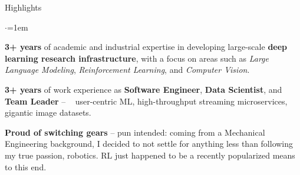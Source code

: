 \begin{xSection}{Highlights}
    \vspace{2mm}

    \small

    \begin{list}{$\cdot$}{\leftmargin=1em} %


    \item \textbf{3+ years} of academic and industrial expertise in developing large-scale \textbf{deep learning research infrastructure}, with a focus on areas such as \textit{Large Language Modeling}, \textit{Reinforcement Learning}, and \textit{Computer Vision}.

    \item \textbf{3+ years} of work experience as \textbf{Software Engineer}, \textbf{Data Scientist}, and \textbf{Team Leader} -- \eg~ user-centric ML, high-throughput streaming microservices, gigantic image datasets.

    \item \textbf{Proud of switching gears} -- pun intended: coming from a Mechanical Engineering background, I decided to not settle for anything less than following my true passion, robotics. RL just happened to be a recently popularized means to this end.


            






    \end{list}


\end{xSection}
